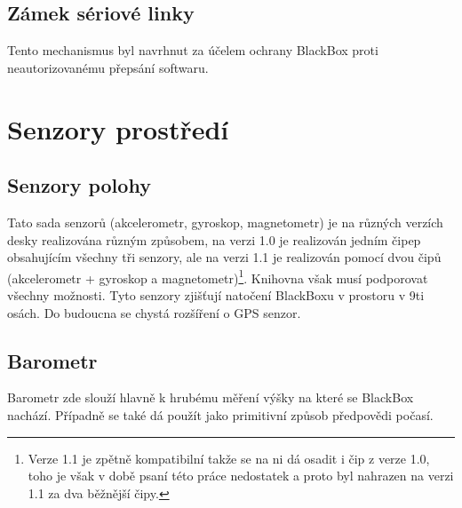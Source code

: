 \subsection{Zámek sériové linky}
Tento mechanismus byl navrhnut za účelem ochrany BlackBox proti neautorizovanému přepsání softwaru.

\section{Senzory prostředí}

\subsection{Senzory polohy}
Tato sada senzorů (akcelerometr, gyroskop, magnetometr) je na různých verzích desky realizována různým způsobem, na verzi 1.0 je realizován jedním čipep obsahujícím všechny tři senzory, ale na verzi 1.1 je realizován pomocí dvou čipů (akcelerometr + gyroskop a magnetometr)\footnote{Verze 1.1 je zpětně kompatibilní takže se na ni dá osadit i čip z verze 1.0, toho je však v době psaní této práce nedostatek a proto byl nahrazen na verzi 1.1 za dva běžnější čipy.}.
Knihovna však musí podporovat všechny možnosti.
Tyto senzory zjišťují natočení BlackBoxu v prostoru v 9ti osách.
Do budoucna se chystá rozšíření o GPS senzor. 

\subsection{Barometr}
Barometr zde slouží hlavně k hrubému měření výšky na které se BlackBox nachází.
Případně se také dá použít jako primitivní způsob předpovědi počasí.